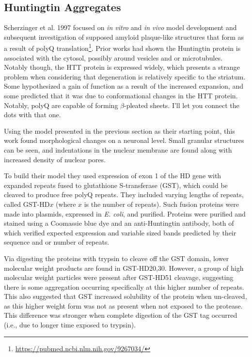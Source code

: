 \subsection*{Huntingtin Aggregates}

Scherzinger et al. 1997 focused on \textit{in vitro} and \textit{in vivo} model development and subsequent investigation of supposed amyloid plaque-like structures that form as a result of polyQ translation\footnote{\url{https://pubmed.ncbi.nlm.nih.gov/9267034/}}. Prior works had shown the Huntingtin protein is associated with the cytosol, possibly around vesicles and or microtubules. Notably though, the HTT protein is expressed widely, which presents a strange problem when considering that degeneration is relatively specific to the striatum. Some hypothesized a gain of function as a result of the increased expansion, and some predicted that it was due to conformational changes in the HTT protein. Notably, polyQ are capable of forming $\beta$-pleated sheets. I'll let you connect the dots with that one.\newline

Using the model presented in the previous section as their starting point, this work found morphological changes on a neuronal level. Small granular structures can be seen, and indentations in the nuclear membrane are found along with increased density of nuclear pores.\newline

To build their model they used expression of exon 1 of the HD gene with expanded repeats fused to glutathione S-transferase (GST), which could be cleaved to produce free polyQ repeats. They included varying lengths of repeats, called GST-HD$x$ (where $x$ is the number of repeats). Such fusion proteins were made into plasmids, expressed in \textit{E. coli}, and purified. Proteins were purified and stained using a Coomassie blue dye and an anti-Huntingtin antibody, both of which verified expected expression and variable sized bands predicted by their sequence and or number of repeats.\newline

Via digesting the proteins with trypsin to cleave off the GST domain, lower molecular weight products are found in GST-HD20,30. However, a group of high molecular weight particles were present after GST-HD51 cleavage, suggesting there is some aggregation occurring specifically at this higher number of repeats. This also suggested that GST increased solubility of the protein when un-cleaved, as this higher weight form was not as present when not exposed to the protease. This difference was stronger when complete digestion of the GST tag occurred (i.e., due to longer time exposed to trypsin).\newline

